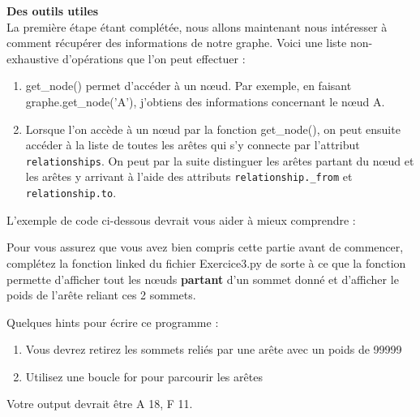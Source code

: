 \begin{Exercice}[10 minutes]\textbf{Des outils utiles}\\
    La première étape étant complétée, nous allons maintenant nous intéresser à comment récupérer des informations de notre graphe. Voici une liste non-exhaustive d'opérations que l'on peut effectuer :\\
    \begin{enumerate}
        \item get\_node() permet d'accéder à un nœud. Par exemple, en faisant graphe.get\_node('A'), j'obtiens des informations concernant le nœud A.
        \item Lorsque l'on accède à un nœud par la fonction get\_node(), on peut ensuite accéder à la liste de toutes les arêtes qui s'y connecte par l'attribut \lstinline{relationships}. On peut par la suite distinguer les arêtes partant du nœud et les arêtes y arrivant à l'aide des attributs \lstinline{relationship._from} et \lstinline{relationship.to}.
    \end{enumerate}
    
    L'exemple de code ci-dessous devrait vous aider à mieux comprendre :
    
    
    Pour vous assurez que vous avez bien compris cette partie avant de commencer, complétez la fonction linked du fichier Exercice3.py de sorte à ce que la fonction permette d'afficher tout les nœuds \textbf{partant} d'un sommet donné et d'afficher le poids de l'arête reliant ces 2 sommets.\\
    
    
    \begin{conseil}
        Quelques hints pour écrire ce programme :
        \begin{enumerate}
            \item Vous devrez retirez les sommets reliés par une arête avec un poids de 99999
            \item Utilisez une boucle for pour parcourir les arêtes
        \end{enumerate}
    Votre output devrait être A 18, F 11.
    \end{conseil}
    \begin{solution}
        
    \end{solution}
\end{Exercice}
\newpage

